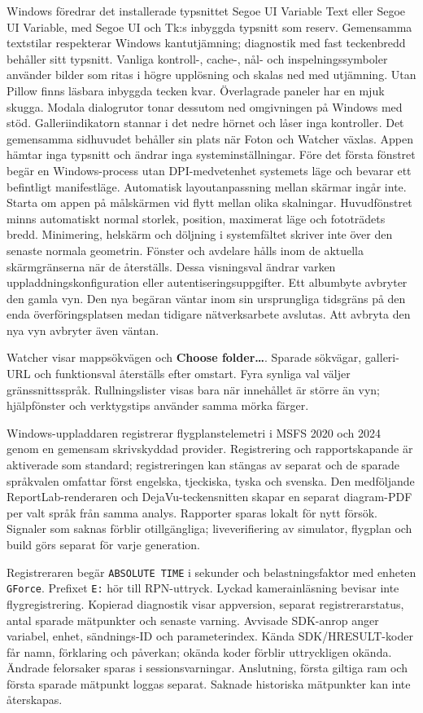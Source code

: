 \documentclass[11pt,a4paper]{article}
\newcommand{\ui}[1]{\textbf{#1}}
\begin{document}
Windows föredrar det installerade typsnittet Segoe UI Variable Text eller
Segoe UI Variable, med Segoe UI och Tk:s inbyggda typsnitt som reserv. Gemensamma textstilar
respekterar Windows kantutjämning; diagnostik med fast teckenbredd behåller
sitt typsnitt. Vanliga kontroll-, cache-, nål- och inspelningssymboler
använder bilder som ritas i högre upplösning och skalas ned med utjämning.
Utan Pillow finns läsbara inbyggda tecken kvar. Överlagrade paneler har en
mjuk skugga. Modala dialogrutor tonar dessutom ned omgivningen på Windows
med stöd. Galleriindikatorn stannar i det nedre hörnet och låser inga kontroller.
Det gemensamma sidhuvudet behåller sin plats när Foton och Watcher växlas.
Appen hämtar inga typsnitt
och ändrar inga systeminställningar. Före det första fönstret begär en
Windows-process utan DPI-medvetenhet systemets läge och bevarar ett befintligt
manifestläge. Automatisk layoutanpassning mellan skärmar ingår inte.
Starta om appen på målskärmen vid flytt mellan olika skalningar.
Huvudfönstret minns automatiskt normal storlek, position, maximerat läge
och fototrädets bredd. Minimering, helskärm och döljning i systemfältet
skriver inte över den senaste normala geometrin. Fönster och avdelare hålls
inom de aktuella skärmgränserna när de återställs. Dessa visningsval ändrar
varken uppladdningskonfiguration eller autentiseringsuppgifter.
Ett albumbyte avbryter den gamla vyn. Den nya begäran väntar inom sin
ursprungliga tidsgräns på den enda överföringsplatsen medan tidigare
nätverksarbete avslutas. Att avbryta den nya vyn avbryter även väntan.

Watcher visar mappsökvägen och \ui{Choose folder…}. Sparade
sökvägar, galleri-URL och funktionsval återställs efter omstart. Fyra synliga
val väljer gränssnittsspråk. Rullningslister visas bara när innehållet är
större än vyn; hjälpfönster och verktygstips använder samma mörka färger.

Windows-uppladdaren registrerar flygplanstelemetri i MSFS 2020 och 2024 genom
en gemensam skrivskyddad provider. Registrering och rapportskapande är
aktiverade
som standard; registreringen kan stängas av separat och de sparade språkvalen
omfattar först engelska, tjeckiska, tyska och svenska. Den medföljande
ReportLab-renderaren och DejaVu-teckensnitten skapar en separat diagram-PDF per
valt språk från samma analys. Rapporter sparas lokalt för nytt försök. Signaler
som saknas förblir otillgängliga; liveverifiering av simulator, flygplan och
build görs separat för varje generation.

Registreraren begär \texttt{ABSOLUTE TIME} i sekunder och belastningsfaktor
med enheten \texttt{GForce}. Prefixet \texttt{E:} hör till RPN-uttryck.
Lyckad kamerainläsning bevisar inte flygregistrering. Kopierad diagnostik visar
appversion, separat registrerarstatus, antal sparade mätpunkter och senaste
varning. Avvisade SDK-anrop anger variabel, enhet, sändnings-ID och
parameterindex. Kända SDK/HRESULT-koder får namn, förklaring och påverkan;
okända koder förblir uttryckligen okända. Ändrade felorsaker sparas i
sessionsvarningar. Anslutning, första giltiga ram och första sparade mätpunkt
loggas separat.
Saknade historiska mätpunkter kan inte återskapas.
\end{document}
